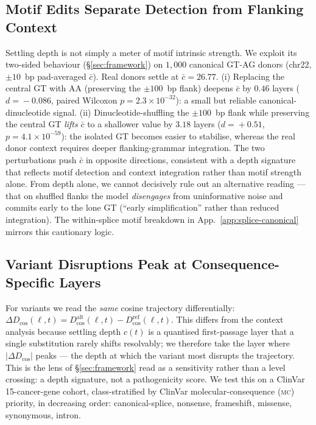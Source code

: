 \documentclass{article}
\theoremstyle{plain}
\theoremstyle{definition}
\theoremstyle{remark}
\newcommand{\Dcos}{D_{\cos}}
\newcommand{\DDcos}{\Delta D_{\cos}}
\begin{document}
\subsection{Motif Edits Separate Detection from Flanking Context}
\label{sec:motif-controls}

Settling depth is not simply a meter of motif intrinsic strength. We exploit its two-sided behaviour (\S\ref{sec:framework}) on $1{,}000$ canonical GT-AG donors (chr22, $\pm 10$~bp pad-averaged $\bar c$). Real donors settle at $\bar c\!=\!26.77$. (i) Replacing the central GT with AA (preserving the $\pm 100$~bp flank) deepens $\bar c$ by $0.46$ layers ($d\!=\!-0.086$, paired Wilcoxon $p\!=\!2.3\!\times\!10^{-32}$): a small but reliable canonical-dinucleotide signal. (ii) Dinucleotide-shuffling the $\pm 100$~bp flank while preserving the central GT \emph{lifts} $\bar c$ to a shallower value by $3.18$ layers ($d\!=\!+0.51$, $p\!=\!4.1\!\times\!10^{-59}$): the isolated GT becomes easier to stabilise, whereas the real donor context requires deeper flanking-grammar integration. The two perturbations push $\bar c$ in opposite directions, consistent with a depth signature that reflects motif detection and context integration rather than motif strength alone. From depth alone, we cannot decisively rule out an alternative reading --- that on shuffled flanks the model \emph{disengages} from uninformative noise and commits early to the lone GT (``early simplification'' rather than reduced integration). The within-splice motif breakdown in App.~\ref{app:splice-canonical} mirrors this cautionary logic.

\subsection{Variant Disruptions Peak at Consequence-Specific Layers}
\label{sec:variant-disruption}

For variants we read the \emph{same} cosine trajectory differentially: $\DDcos(\ell,t)\!=\!\Dcos^{\mathrm{alt}}(\ell,t)-\Dcos^{\mathrm{ref}}(\ell,t)$. This differs from the context analysis because settling depth $c(t)$ is a quantised first-passage layer that a single substitution rarely shifts resolvably; we therefore take the layer where $|\DDcos|$ peaks --- the depth at which the variant most disrupts the trajectory. This is the lens of \S\ref{sec:framework} read as a sensitivity rather than a level crossing: a depth signature, not a pathogenicity score. We test this on a ClinVar~\cite{landrum2020clinvar} 15-cancer-gene cohort, class-stratified by ClinVar molecular-consequence (\textsc{mc}) priority, in decreasing order: canonical-splice, nonsense, frameshift, missense, synonymous, intron.
\end{document}
